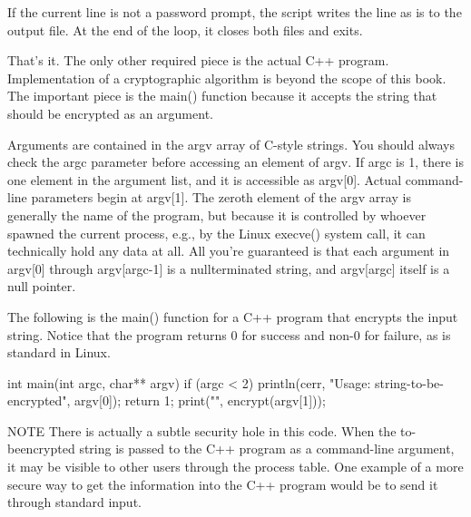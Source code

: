 \begin{shell}
        $result = `./encryptString $1`;
        if ($? != 0) { exit(-1); }
        print OUTPUT "Password: $result\n";
    } else {
\end{shell}

If the current line is not a password prompt, the script writes the line as is to the output file. At the end of the loop, it closes both files and exits.

\begin{shell}
        print OUTPUT "$line";
    }
}
close (INPUT);
close (OUTPUT);
\end{shell}

That’s it. The only other required piece is the actual C++ program. Implementation of a cryptographic algorithm is beyond the scope of this book. The important piece is the main() function because it accepts the string that should be encrypted as an argument.

Arguments are contained in the argv array of C-style strings. You should always check the argc parameter before accessing an element of argv. If argc is 1, there is one element in the argument list, and it is accessible as argv[0]. Actual command-line parameters begin at argv[1]. The zeroth element of the argv array is generally the name of the program, but because it is controlled by whoever spawned the current process, e.g., by the Linux execve() system call, it can technically hold any data at all. All you’re guaranteed is that each argument in argv[0] through argv[argc-1] is a nullterminated string, and argv[argc] itself is a null pointer.

The following is the main() function for a C++ program that encrypts the input string. Notice that the program returns 0 for success and non-0 for failure, as is standard in Linux.

\begin{cpp}
int main(int argc, char** argv)
{
    if (argc < 2) {
        println(cerr, "Usage: {} string-to-be-encrypted", argv[0]);
        return 1;
    }
    print("{}", encrypt(argv[1]));
}
\end{cpp}

\begin{myNotic}{NOTE}
There is actually a subtle security hole in this code. When the to-beencrypted string is passed to the C++ program as a command-line argument, it may be visible to other users through the process table. One example of a more secure way to get the information into the C++ program would be to send it through standard input.
\end{myNotic}

